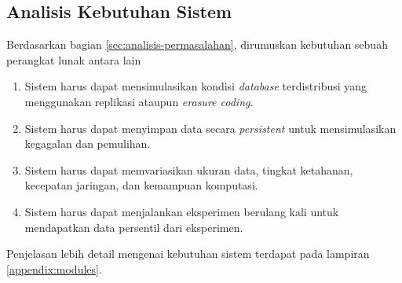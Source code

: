 \subsection{Analisis Kebutuhan Sistem}
\label{sec:analisis-kebutuhan-sistem}

Berdasarkan bagian \ref{sec:analisis-permasalahan}, dirumuskan kebutuhan sebuah perangkat lunak antara lain
\begin{enumerate}

    \item Sistem harus dapat mensimulasikan kondisi \textit{database} terdistribusi yang menggunakan replikasi ataupun \textit{erasure coding}.
    \item Sistem harus dapat menyimpan data secara \textit{persistent} untuk mensimulasikan kegagalan dan pemulihan.
    \item Sistem harus dapat memvariasikan ukuran data, tingkat ketahanan, kecepatan jaringan, dan kemampuan komputasi.
    \item Sistem harus dapat menjalankan eksperimen berulang kali untuk mendapatkan data persentil dari eksperimen.
    
\end{enumerate}

Penjelasan lebih detail mengenai kebutuhan sistem terdapat pada lampiran \ref{appendix:modules}.